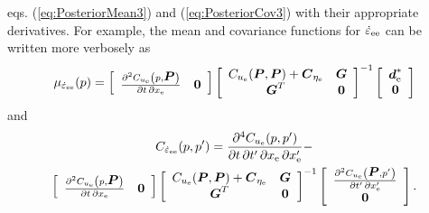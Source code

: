\documentclass[extra,mreferee]{gji}
\begin{document}
eqs. (\ref{eq:PosteriorMean3}) and (\ref{eq:PosteriorCov3}) with their
appropriate derivatives. For example, the mean and covariance
functions for $\dot\varepsilon_{\mathrm{e}\mathrm{e}}$ can be written more verbosely as
\begin{equation}\label{eq:StrainMeanEE}
\mu_{\strain_{\e\e}}(p) = \left[\begin{array}{cc}
                          \frac{\partial^2 C_{u_\e}\left( p,\points \right)}{\partial t \, \partial x_\e} & \zeros \\
                          \end{array}\right]
                          \left[\begin{array}{cc}
                          C_{u_\e}(\points,\points) + \mitbf{C}_{\eta_\e} & \G \\
                          \G^T  & \zeros \\
                          \end{array}\right]^{-1}
                          \left[\begin{array}{c}
                          \data^*_\e \\
                          \zeros \\
                          \end{array}\right]
\end{equation}    
and
\begin{multline}\label{eq:StrainCovEE}
C_{\strain_{\e\e}}(p,p') = \frac{\partial^4 C_{u_\e}(p,p')}{\partial t \, \partial t' \, \partial x_\e \, \partial x'_\e} - \\
                           \left[\begin{array}{cc}
                           \frac{\partial^2 C_{u_\e}\left( p,\points \right)}{\partial t \, \partial x_\e} & \zeros \\
                           \end{array}\right]
                           \left[\begin{array}{cc}
                           C_{u_\e}(\points,\points) + \mitbf{C}_{\eta_\e} & \G \\
                           \G^T  & \zeros \\
                           \end{array}\right]^{-1}
                           \left[\begin{array}{c}
                           \frac{\partial^2 C_{u_\e}\left(\points, p' \right)}{\partial t' \, \partial x'_\e} \\
                           \zeros \\
                           \end{array}\right].
\end{multline}    
\end{document}
